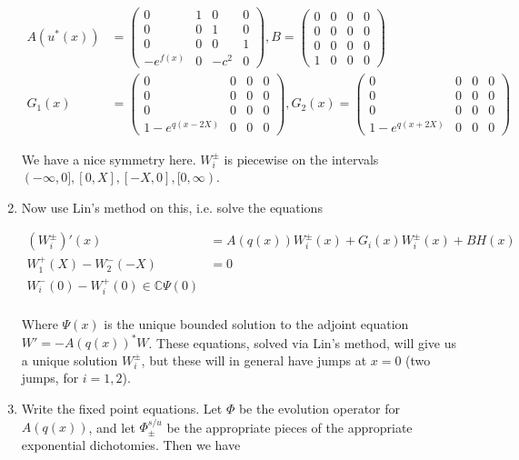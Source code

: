 \documentclass[12pt]{article}
\def\C{{\mathbb C}}
\begin{document}
\begin{enumerate}
\begin{align*}
A(u^*(x)) &= \begin{pmatrix}
0 & 1 & 0 & 0 \\
0 & 0 & 1 & 0 \\
0 & 0 & 0 & 1 \\
-e^{f(x)} & 0 & -c^2 & 0 
\end{pmatrix},
B = \begin{pmatrix}
0 & 0 & 0 & 0 \\
0 & 0 & 0 & 0 \\
0 & 0 & 0 & 0 \\
1 & 0 & 0 & 0 
\end{pmatrix} \\
G_1(x) &= \begin{pmatrix}
0 & 0 & 0 & 0 \\
0 & 0 & 0 & 0 \\
0 & 0 & 0 & 0 \\
1 - e^{q(x - 2 X)} & 0 & 0 & 0 
\end{pmatrix}, 
G_2(x) = \begin{pmatrix}
0 & 0 & 0 & 0 \\
0 & 0 & 0 & 0 \\
0 & 0 & 0 & 0 \\
1 - e^{q(x + 2 X)} & 0 & 0 & 0 
\end{pmatrix}
\end{align*}

We have a nice symmetry here. $W_i^\pm$ is piecewise on the intervals $(-\infty, 0], [0, X], [-X, 0], [0, \infty)$.

\item Now use Lin's method on this, i.e. solve the equations

\begin{align*}
(W_i^\pm)'(x) &= A(q(x)) W_i^\pm(x) + G_i(x) W_i^\pm(x)+ B H(x) \\
W_1^+(X) - W_2^-(-X) &= 0 \\
W_i^-(0) - W_i^+(0) \in \C \Psi(0) \\
\end{align*}

Where $\Psi(x)$ is the unique bounded solution to the adjoint equation $W' = -A(q(x))^* W$. These equations, solved via Lin's method, will give us a unique solution $W_i^\pm$, but these will in general have jumps at $x = 0$ (two jumps, for $i = 1, 2$).

\item Write the fixed point equations. Let $\Phi$ be the evolution operator for $A(q(x))$, and let $\Phi^{s/u}_\pm$ be the appropriate pieces of the appropriate exponential dichotomies. Then we have


\end{enumerate}
\end{document}
